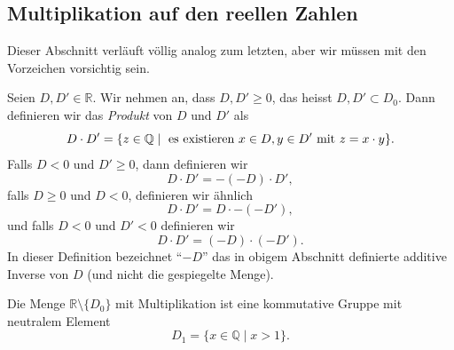 \documentclass[../main.tex]{subfiles}
\begin{document}
\subsection*{Multiplikation auf den reellen Zahlen}
Dieser Abschnitt verläuft völlig analog zum letzten,
aber wir müssen mit den Vorzeichen vorsichtig sein.

\begin{definition}
Seien
$D ,D' \in \mathbb R$. Wir nehmen an, dass $D, D' \geq 0$,
das heisst $D, D' \subset D_{0}$. Dann definieren wir das \textit{Produkt}
von $D$ und $D'$ als
\[D \cdot D' = \{z \in \mathbb Q \mid \textup{ es existieren } x \in D,
  y \in D' \textup{ mit } z = x \cdot y\}.\]
Falls $D < 0$ und $D' \geq 0$, dann definieren wir
\[D \cdot D' = -(-D) \cdot D',\]
falls $D \geq 0$ und $D < 0$, definieren wir ähnlich
\[D \cdot D' = D \cdot -(-D'),\]
und falls $D < 0$ und $D' < 0$ definieren wir
\[D \cdot D' = (-D) \cdot (-D').\]
In dieser Definition bezeichnet ``$-D$'' das in obigem Abschnitt
definierte additive Inverse von $D$ (und nicht die gespiegelte Menge).
\end{definition}

\begin{manuallemma}{2}
  Die Menge $\mathbb R \setminus \{D_{0}\}$ mit Multiplikation ist eine
  kommutative Gruppe mit neutralem Element
  \[D_{1} = \{x \in \mathbb Q \mid x > 1\}.\]
\end{manuallemma}
\end{document}
